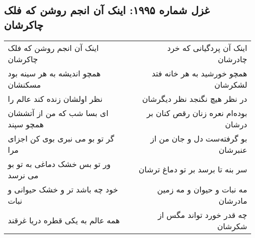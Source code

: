 \begin{center}
\section*{غزل شماره ۱۹۹۵: اینک آن انجم روشن که فلک چاکرشان}
\label{sec:1995}
\begin{longtable}{l p{0.5cm} r}
اینک آن انجم روشن که فلک چاکرشان
&&
اینک آن پردگیانی که خرد چادرشان
\\
همچو اندیشه به هر سینه بود مسکنشان
&&
همچو خورشید به هر خانه فتد لشکرشان
\\
نظر اولشان زنده کند عالم را
&&
در نظر هیچ نگنجد نظر دیگرشان
\\
ای بسا شب که من از آتششان همچو سپند
&&
بوده‌ام نعره زنان رقص کنان بر درشان
\\
گر تو بو می نبری بوی کن اجزای مرا
&&
بو گرفته‌ست دل و جان من از عنبرشان
\\
ور تو بس خشک دماغی به تو بو می نرسد
&&
سر بنه تا برسد بر تو دماغ ترشان
\\
خود چه باشد تر و خشک حیوانی و نبات
&&
مه نبات و حیوان و مه زمین مادرشان
\\
همه عالم به یکی قطره دریا غرقند
&&
چه قدر خورد تواند مگس از شکرشان
\\
\end{longtable}
\end{center}
